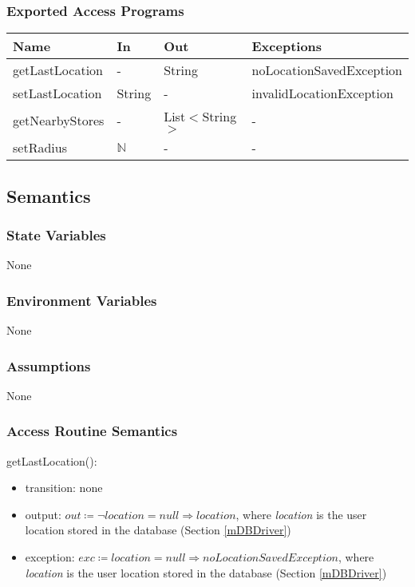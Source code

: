 \documentclass[12pt, titlepage]{article}
\begin{document}
\subsubsection{Exported Access Programs}

\begin{center}
\begin{tabular}{p{5cm} p{3cm} p{3cm} p{5cm}}
\hline
\textbf{Name} & \textbf{In} & \textbf{Out} & \textbf{Exceptions} \\
\hline
getLastLocation & - & String & noLocationSavedException \\
setLastLocation & String & - & invalidLocationException \\
getNearbyStores & - & List$<$String$>$ & - \\
setRadius & $\mathbb{N}$ & - & - \\
\hline
\end{tabular}
\end{center}

\subsection{Semantics}

\subsubsection{State Variables}
None

\subsubsection{Environment Variables}
None

\subsubsection{Assumptions}
None

\subsubsection{Access Routine Semantics}

\noindent getLastLocation():
\begin{itemize}
\item transition: none
\item output: \( \textit{out} \coloneqq \neg location = null \Rightarrow  location \), where \textit{location} is the user location stored in the database (Section \ref{mDBDriver})
\item exception: \( \textit{exc} \coloneqq location = null \Rightarrow  noLocationSavedException \), where \textit{location} is the user location stored in the database (Section \ref{mDBDriver})
\end{itemize}
\end{document}
